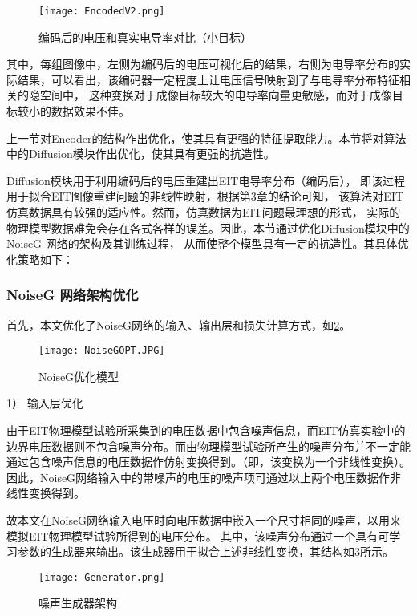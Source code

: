 \begin{figure}[H]
    \centering
    \texttt{[image: EncodedV2.png]}
    \caption{编码后的电压和真实电导率对比（小目标）}
    \label{figure:EncodedV2}
\end{figure}

其中，每组图像中，左侧为编码后的电压可视化后的结果，右侧为电导率分布的实际结果，可以看出，该编码器一定程度上让电压信号映射到了与电导率分布特征相关的隐空间中，
这种变换对于成像目标较大的电导率向量更敏感，而对于成像目标较小的数据效果不佳。


上一节对Encoder的结构作出优化，使其具有更强的特征提取能力。本节将对算法中的Diffusion模块作出优化，使其具有更强的抗造性。

Diffusion模块用于利用编码后的电压重建出EIT电导率分布（编码后），
即该过程用于拟合EIT图像重建问题的非线性映射，根据第3章的结论可知，
该算法对EIT仿真数据具有较强的适应性。然而，仿真数据为EIT问题最理想的形式，
实际的物理模型数据难免会存在各式各样的误差。因此，本节通过优化Diffusion模块中的NoiseG 网络的架构及其训练过程，
从而使整个模型具有一定的抗造性。其具体优化策略如下：

\subsubsection{NoiseG 网络架构优化}
 
首先，本文优化了NoiseG网络的输入、输出层和损失计算方式，如\cref{figure:NoiseGOPT}。
\begin{figure}[h]
    \centering
    \texttt{[image: NoiseGOPT.JPG]}
    \caption{NoiseG优化模型}
    \label{figure:NoiseGOPT}
\end{figure}

1） 输入层优化
 
由于EIT物理模型试验所采集到的电压数据中包含噪声信息，而EIT仿真实验中的边界电压数据则不包含噪声分布。而由物理模型试验所产生的噪声分布并不一定能通过包含噪声信息的电压数据作仿射变换得到。（即，该变换为一个非线性变换）。因此，NoiseG网络输入中的带噪声的电压的噪声项可通过以上两个电压数据作非线性变换得到。

 
故本文在NoiseG网络输入电压时向电压数据中嵌入一个尺寸相同的噪声，以用来模拟EIT物理模型试验所得到的电压分布。
其中，该噪声分布通过一个具有可学习参数的生成器来输出。该生成器用于拟合上述非线性变换，其结构如\cref{figure:Generator}所示。

\begin{figure}[h]
    \centering
    \texttt{[image: Generator.png]}
    \caption{噪声生成器架构}
    \label{figure:Generator}
\end{figure}


